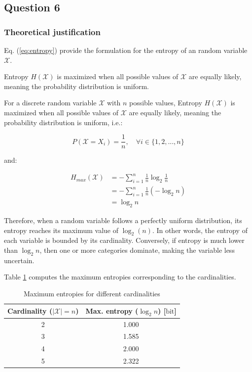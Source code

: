 \documentclass{article}
\begin{document}
\subsection{Question 6}

\subsubsection*{Theoretical justification}

Eq. (\ref{eq:entropy}) provide the formulation for the entropy of an random variable $\mathcal{X}$.

Entropy $H(\mathcal{X})$ is maximized when all possible values of $\mathcal{X}$ are equally likely, meaning the probability distribution is uniform. 

For a discrete random variable $\mathcal{X}$ with $n$ possible values, Entropy $H(\mathcal{X})$ is maximized when all possible values of $\mathcal{X}$ are equally likely, meaning the probability distribution is uniform, i.e.:

\begin{equation*}
P(\mathcal{X} = X_i) = \frac{1}{n}, \quad \forall i \in \{1, 2, ..., n\}
\end{equation*}

and:

\begin{align*}
H_{max}(\mathcal{X}) &=  - \sum_{i=1}^{n} \frac{1}{n} \log_2 \frac{1}{n}\\
&= - \sum_{i=1}^{n} \frac{1}{n} (-\log_2 n)\\
&= \log_2 n
\end{align*}

Therefore, when a random variable follows a perfectly uniform distribution, its entropy reaches its maximum value of $\log_2(n)$. In other words, the entropy of each variable is bounded by its cardinality. Conversely, if entropy is much lower than $\log_2 n$, then one or more categories dominate, making the variable less uncertain.


Table \ref{tab:max_entropy} computes the maximum entropies corresponding to the cardinalities.

\begin{table}[h]
    \caption{Maximum entropies for different cardinalities}
    \label{tab:max_entropy}
    \centering
    \footnotesize
    \begin{tabular}{cc}
        \hline
        {Cardinality ($|\mathcal{X}| = n$)} & {Max. entropy ($\log_2 n$) [$\mbox{bit}$]} \\
        \hline
        2 & 1.000 \\
        3 & 1.585 \\
        4 & 2.000 \\
        5 & 2.322 \\
        \hline
    \end{tabular}
\end{table}
\end{document}

